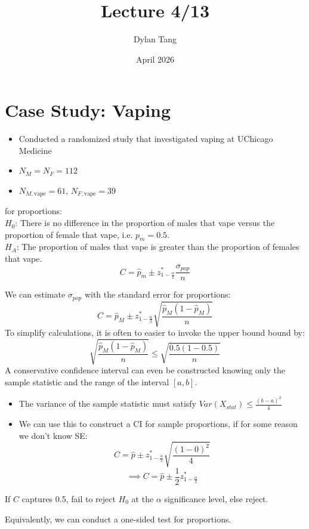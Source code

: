 \documentclass{article}
\title{Lecture 4/13}
\author{Dylan Tang}
\date{April 2026}
\begin{document}
\maketitle

\section{Case Study: Vaping}
\begin{itemize}
    \item Conducted a randomized study that investigated vaping at UChicago Medicine
    \item $N_M = N_F = 112$
    \item $N_{M, \text{vape}} = 61$, $N_{F, \text{vape}} = 39$
\end{itemize}

 for proportions: \\
$H_0$: There is no difference in the proportion of males that vape versus the proportion of female that vape, i.e. $p_m = 0.5$. \\
$H_A$: The proportion of males that vape is greater than the proportion of females that vape. \\

\[
    C = \hat{p}_m \pm z^*_{1 - \frac{\alpha}{2}}\frac{\sigma_{pop}}{n}
\]

We can estimate $\sigma_{pop}$ with the standard error for proportions:
\[
     C = \hat{p}_M \pm z^*_{1 - \frac{\alpha}{2}} \sqrt{\frac{\hat{p}_M(1 - \hat{p}_M)}{n}}
\]
To simplify calculations, it is often to easier to invoke the upper bound bound by:
\[
    \sqrt{\frac{\hat{p}_M(1 - \hat{p}_M)}{n}} \leq \sqrt{\frac{0.5(1-0.5)}{n}}
\]
A conservative confidence interval can even be constructed knowing only the sample statistic and the range of the interval $[a,b]$.
\begin{itemize}
    \item The variance of the sample statistic must satisfy $Var(X_{stat}) \leq \frac{(b-a)^2}{4}$
    \item We can use this to construct a CI for sample proportions, if for some reason we don't know SE:
    \[
        C = \hat{p} \pm z^*_{1 - \frac{\alpha}{2}}\sqrt{\frac{(1-0)^2}{4}}
    \]
    \[
        \implies C = \hat{p} \pm \frac{1}{2}z^*_{1 - \frac{\alpha}{2}}
    \]
\end{itemize}

If $C$ captures 0.5, fail to reject $H_0$ at the $\alpha$ significance level, else reject.

Equivalently, we can conduct a one-sided test for proportions.
\end{document}
